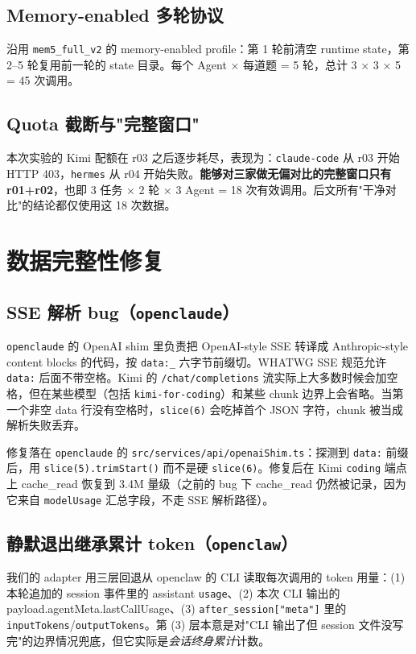 \documentclass[11pt,a4paper]{article}
\begin{document}
\subsection{Memory-enabled 多轮协议}
沿用 \texttt{mem5\_full\_v2} 的 memory-enabled profile：第 1 轮前清空 runtime state，第 2–5 轮复用前一轮的 state 目录。每个 Agent × 每道题 = 5 轮，总计 3 × 3 × 5 = 45 次调用。

\subsection{Quota 截断与"完整窗口"}
本次实验的 Kimi 配额在 r03 之后逐步耗尽，表现为：\texttt{claude-code} 从 r03 开始 HTTP 403，\texttt{hermes} 从 r04 开始失败。\textbf{能够对三家做无偏对比的完整窗口只有 r01+r02}，也即 3 任务 × 2 轮 × 3 Agent = 18 次有效调用。后文所有"干净对比"的结论都仅使用这 18 次数据。

\section{数据完整性修复}

\subsection{SSE 解析 bug（\texttt{openclaude}）}
\texttt{openclaude} 的 OpenAI shim 里负责把 OpenAI-style SSE 转译成 Anthropic-style content blocks 的代码，按 \texttt{data:\_} 六字节前缀切。WHATWG SSE 规范允许 \texttt{data:} 后面不带空格。Kimi 的 \texttt{/chat/completions} 流实际上大多数时候会加空格，但在某些模型（包括 \texttt{kimi-for-coding}）和某些 chunk 边界上会省略。当第一个非空 data 行没有空格时，\texttt{slice(6)} 会吃掉首个 JSON 字符，chunk 被当成解析失败丢弃。

修复落在 \texttt{openclaude} 的 \texttt{src/services/api/openaiShim.ts}：探测到 \texttt{data:} 前缀后，用 \texttt{slice(5).trimStart()} 而不是硬 \texttt{slice(6)}。修复后在 Kimi \texttt{coding} 端点上 cache\_read 恢复到 3.4M 量级（之前的 bug 下 cache\_read 仍然被记录，因为它来自 \texttt{modelUsage} 汇总字段，不走 SSE 解析路径）。

\subsection{静默退出继承累计 token（\texttt{openclaw}）}
我们的 adapter 用三层回退从 openclaw 的 CLI 读取每次调用的 token 用量：(1) 本轮追加的 session 事件里的 assistant \texttt{usage}、(2) 本次 CLI 输出的 payload.agentMeta.lastCallUsage、(3) \texttt{after\_session["meta"]} 里的 \texttt{inputTokens}/\texttt{outputTokens}。第 (3) 层本意是对"CLI 输出了但 session 文件没写完"的边界情况兜底，但它实际是\emph{会话终身累计}计数。
\end{document}
